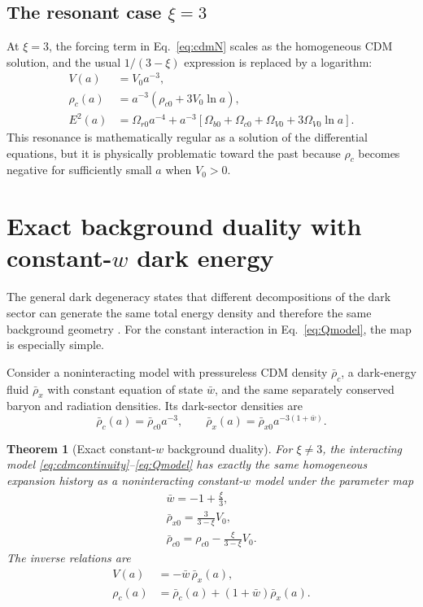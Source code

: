 \documentclass[11pt]{article}
\newtheorem{theorem}{Theorem}[section]
\theoremstyle{remark}
\begin{document}
\subsection{The resonant case \texorpdfstring{$\xi=3$}{xi=3}}

At $\xi=3$, the forcing term in Eq.~\eqref{eq:cdmN} scales as the homogeneous CDM solution, and the usual $1/(3-\xi)$ expression is replaced by a logarithm:
\begin{align}
    V(a)&=V_0a^{-3},\label{eq:xi3V}\\
    \rho_c(a)&=a^{-3}\left(\rho_{c0}+3V_0\ln a\right),\label{eq:xi3rhoc}\\
    E^2(a)&=\Omega_{r0}a^{-4}
    +a^{-3}\left[\Omega_{b0}+\Omega_{c0}+\Omega_{V0}
    +3\Omega_{V0}\ln a\right].
    \label{eq:xi3E}
\end{align}
This resonance is mathematically regular as a solution of the differential equations, but it is physically problematic toward the past because $\rho_c$ becomes negative for sufficiently small $a$ when $V_0>0$.

\section{Exact background duality with constant-\texorpdfstring{$w$}{w} dark energy}
\label{sec:duality}

The general dark degeneracy states that different decompositions of the dark sector can generate the same total energy density and therefore the same background geometry \cite{Kunz2009,Aviles2011,vonMarttens2020}.  For the constant interaction in Eq.~\eqref{eq:Qmodel}, the map is especially simple.

Consider a noninteracting model with pressureless CDM density $\bar\rho_c$, a dark-energy fluid $\bar\rho_x$ with constant equation of state $\bar w$, and the same separately conserved baryon and radiation densities.  Its dark-sector densities are
\begin{equation}
    \bar\rho_c(a)=\bar\rho_{c0}a^{-3},
    \qquad
    \bar\rho_x(a)=\bar\rho_{x0}a^{-3(1+\bar w)}.
\end{equation}

\begin{theorem}[Exact constant-$w$ background duality]
\label{thm:duality}
For $\xi\neq3$, the interacting model \eqref{eq:cdmcontinuity}--\eqref{eq:Qmodel} has exactly the same homogeneous expansion history as a noninteracting constant-$w$ model under the parameter map
\begin{align}
    \boxed{\bar w=-1+\frac{\xi}{3}},\label{eq:wmap}\\
    \boxed{\bar\rho_{x0}=\frac{3}{3-\xi}V_0},\label{eq:rhoxmap}\\
    \boxed{\bar\rho_{c0}=\rho_{c0}-\frac{\xi}{3-\xi}V_0}.\label{eq:rhocmap}
\end{align}
The inverse relations are
\begin{align}
    V(a)&=-\bar w\,\bar\rho_x(a),\label{eq:inverseV}\\
    \rho_c(a)&=\bar\rho_c(a)+(1+\bar w)\bar\rho_x(a).
    \label{eq:inverseC}
\end{align}
\end{theorem}
\end{document}
